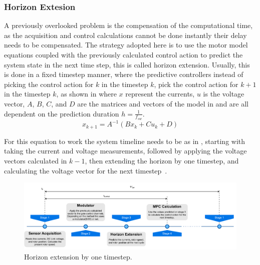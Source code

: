 \subsubsection{Horizon Extesion}
\label{section:Horizon Extesion}%

A previously overlooked problem is the compensation of the computational time, as the acquisition and control calculations cannot be done instantly their delay needs to be compensated. The strategy adopted here is to use the motor model equations  coupled with the previously calculated control action to predict the system state in the next time step, this is called horizon extension. Usually, this is done in a fixed timestep manner, where the predictive controllers instead of picking the control action for $k$ in the timestep $k$, pick the control action for $k+1$ in the timestep $k$, as shown in  where $x$ represent the currents, $u$ is the voltage vector, $A$, $B$, $C$, and $D$ are the matrices and vectors of the model in  and are all dependent on the prediction duration $h = \frac{1}{f_{sw}}$.
\begin{equation}
	x_{k+1} = A^{-1} \left (B x_k + C u_k + D\right )
	\label{eq:horizon_default}
\end{equation}

For this equation to work the system timeline needs to be as in , starting with taking the current and voltage measurements, followed by applying the voltage vectors calculated in $k-1$, then extending the horizon by one timestep, and calculating the voltage vector for the next timestep~\cite{Vazquez:MPC_uses:2014}.

\begin{figure}[!htb]
	\centering
	\includegraphics[width=1\textwidth]{Figures/Horizon Extension default Timeline.pdf}
	\caption[Horizon extension by one timestep.]{Horizon extension by one timestep.}
	\label{fig:horizon_default_timeline} %
\end{figure}

